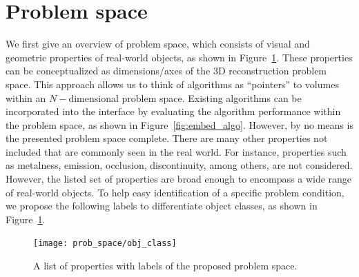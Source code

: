 \section{Problem space}
\label{sec:prob_space}
We first give an overview of problem space, which consists of visual and geometric properties of real-world objects, as shown in Figure~\ref{fig:obj_class}. These properties can be conceptualized as dimensions/axes of the 3D reconstruction problem space. This approach allows us to think of algorithms as ``pointers'' to volumes within an $N-$dimensional problem space. Existing algorithms can be incorporated into the interface by evaluating the algorithm performance within the problem space, as shown in Figure~\ref{fig:embed_algo}. However, by no means is the presented problem space complete. There are many other properties not included that are commonly seen in the real world. For instance, properties such as metalness, emission, occlusion, discontinuity, among others, are not considered. However, the listed set of properties are broad enough to encompass a wide range of real-world objects. To help easy identification of a specific problem condition, we propose the following labels to differentiate object classes, as shown in Figure~\ref{fig:obj_class}.
\begin{figure}[!htbp]
\centering
\texttt{[image: prob\_space/obj\_class]}\\
\caption{A list of properties with labels of the proposed problem space.}
\label{fig:obj_class}
\end{figure}

